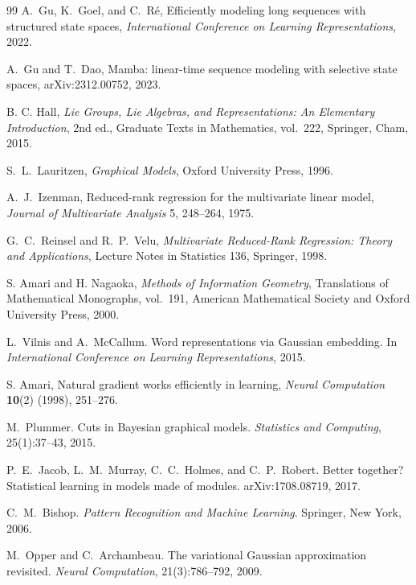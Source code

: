 \documentclass[11pt]{article}
\theoremstyle{definition}
\theoremstyle{remark}
\begin{document}
\begin{thebibliography}{99}
 A.~Gu, K.~Goel, and C.~R{\'e}, Efficiently modeling long sequences with structured state spaces, \emph{International Conference on Learning Representations}, 2022.

 A.~Gu and T.~Dao, Mamba: linear-time sequence modeling with selective state spaces, arXiv:2312.00752, 2023.

B. C. Hall, \emph{Lie Groups, Lie Algebras, and Representations: An Elementary Introduction}, 2nd ed., Graduate Texts in Mathematics, vol.~222, Springer, Cham, 2015.

 S.~L.~Lauritzen, \emph{Graphical Models}, Oxford University Press, 1996.

 A.~J.~Izenman, Reduced-rank regression for the multivariate linear model, \emph{Journal of Multivariate Analysis} 5, 248--264, 1975.

 G.~C.~Reinsel and R.~P.~Velu, \emph{Multivariate Reduced-Rank Regression: Theory and Applications}, Lecture Notes in Statistics 136, Springer, 1998.

S. Amari and H. Nagaoka, \emph{Methods of Information Geometry}, Translations of Mathematical Monographs, vol.~191, American Mathematical Society and Oxford University Press, 2000.

L.~Vilnis and A.~McCallum.
\newblock Word representations via {G}aussian embedding.
\newblock In \emph{International Conference on Learning Representations}, 2015.

S. Amari, Natural gradient works efficiently in learning, \emph{Neural Computation} \textbf{10}(2) (1998), 251--276.

M.~Plummer.
\newblock Cuts in {B}ayesian graphical models.
\newblock \emph{Statistics and Computing}, 25(1):37--43, 2015.

P.~E.~Jacob, L.~M.~Murray, C.~C.~Holmes, and C.~P.~Robert.
\newblock Better together? {S}tatistical learning in models made of modules.
\newblock arXiv:1708.08719, 2017.

C.~M.~Bishop.
\newblock \emph{Pattern Recognition and Machine Learning}.
\newblock Springer, New York, 2006.

M.~Opper and C.~Archambeau.
\newblock The variational {G}aussian approximation revisited.
\newblock \emph{Neural Computation}, 21(3):786--792, 2009.


\end{thebibliography}
\end{document}
